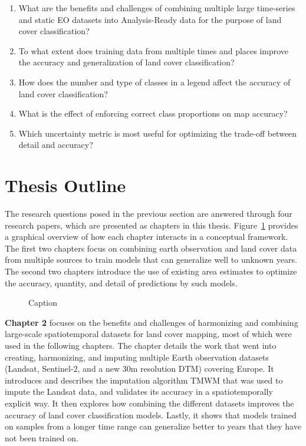 \begin{enumerate}
\item %
What are the benefits and challenges of combining multiple large time-series and static EO datasets into Analysis-Ready data for the purpose of land cover classification?
\item %
To what extent does training data from multiple times and places improve the accuracy and generalization of land cover classification?
\item %
How does the number and type of classes in a legend affect the accuracy of land cover classification?
\item %
What is the effect of enforcing correct class proportions on map accuracy?
\item %
Which uncertainty metric is most useful for optimizing the trade-off between detail and accuracy?
\end{enumerate}

\section{Thesis Outline}

The research questions posed in the previous section are answered through four research papers, which are presented as chapters in this thesis. Figure~\ref{fig:01_conceptual_framework} provides a graphical overview of how each chapter interacts in a conceptual framework. The first two chapters focus on combining earth observation and land cover data from multiple sources to train models that can generalize well to unknown years. The second two chapters introduce the use of existing area estimates to optimize the accuracy, quantity, and detail of predictions by such models.

\begin{figure}
    \centering
    \caption{Caption}
    \label{fig:01_conceptual_framework}
\end{figure}


\textbf{Chapter 2} focuses on the benefits and challenges of harmonizing and combining large-scale spatiotemporal datasets for land cover mapping, most of which were used in the following chapters. The chapter details the work that went into creating, harmonizing, and imputing multiple Earth observation datasets (Landsat, Sentinel-2, and a new 30m resolution DTM) covering Europe. It introduces and describes the imputation algorithm TMWM that was used to impute the Landsat data, and validates its accuracy in a spatiotemporally explicit way. It then explores how combining the different datasets improves the accuracy of land cover classification models. Lastly, it shows that models trained on samples from a longer time range can generalize better to years that they have not been trained on.

